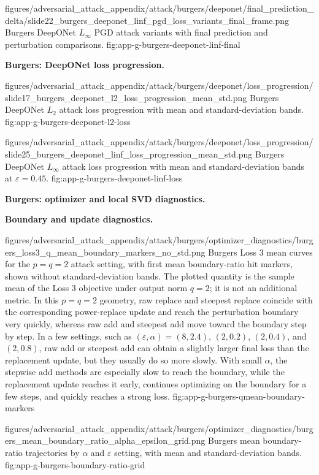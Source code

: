 \appendixattackfigcompact
  {figures/adversarial_attack_appendix/attack/burgers/deeponet/final_prediction_delta/slide22_burgers_deeponet_linf_pgd_loss_variants_final_frame.png}
  {Burgers DeepONet $L_\infty$ PGD attack variants with final prediction and
  perturbation comparisons.}
  {fig:app-g-burgers-deeponet-linf-final}

\noindent\textbf{Burgers: DeepONet loss progression.}

\appendixattackfig
  {figures/adversarial_attack_appendix/attack/burgers/deeponet/loss_progression/slide17_burgers_deeponet_l2_loss_progression_mean_std.png}
  {Burgers DeepONet $L_2$ attack loss progression with mean and
  standard-deviation bands.}
  {fig:app-g-burgers-deeponet-l2-loss}

\appendixattackfig
  {figures/adversarial_attack_appendix/attack/burgers/deeponet/loss_progression/slide25_burgers_deeponet_linf_loss_progression_mean_std.png}
  {Burgers DeepONet $L_\infty$ attack loss progression with mean and
  standard-deviation bands at $\varepsilon=0.45$.}
  {fig:app-g-burgers-deeponet-linf-loss}

\clearpage
\noindent\textbf{Burgers: optimizer and local SVD diagnostics.}

\noindent\textbf{Boundary and update diagnostics.}

\appendixattackfig
  {figures/adversarial_attack_appendix/attack/burgers/optimizer_diagnostics/burgers_loss3_q_mean_boundary_markers_no_std.png}
  {Burgers Loss 3 mean curves for the $p=q=2$ attack setting, with first mean
  boundary-ratio hit markers, shown without standard-deviation bands. The
  plotted quantity is the sample mean of the Loss 3 objective under output
  norm $q=2$; it is not an additional metric. In this $p=q=2$ geometry, raw
  replace and steepest replace coincide with the corresponding power-replace
  update and reach the
  perturbation boundary very quickly, whereas raw add and steepest add move
  toward the boundary step by step. In a few settings, such as
  $(\varepsilon,\alpha)=(8,2.4)$, $(2,0.2)$, $(2,0.4)$, and $(2,0.8)$, raw add or
  steepest add can obtain a slightly larger final loss than the replacement
  update, but they usually do so more slowly. With small $\alpha$, the stepwise
  add methods are especially slow to reach the boundary, while the replacement
  update reaches it early, continues optimizing on the boundary for a few steps,
  and quickly reaches a strong loss.}
  {fig:app-g-burgers-qmean-boundary-markers}

\appendixattackfig
  {figures/adversarial_attack_appendix/attack/burgers/optimizer_diagnostics/burgers_mean_boundary_ratio_alpha_epsilon_grid.png}
  {Burgers mean boundary-ratio trajectories by $\alpha$ and $\varepsilon$ setting,
  with mean and standard-deviation bands.}
  {fig:app-g-burgers-boundary-ratio-grid}

